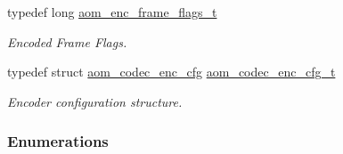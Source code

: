 \begin{DoxyCompactItemize}
typedef long \hyperlink{group__encoder_gacbef92200b831adb94283f84128f83de}{aom\+\_\+enc\+\_\+frame\+\_\+flags\+\_\+t}
\begin{DoxyCompactList}\small\item\em Encoded Frame Flags. \end{DoxyCompactList}\item 
typedef struct \hyperlink{structaom__codec__enc__cfg}{aom\+\_\+codec\+\_\+enc\+\_\+cfg} \hyperlink{group__encoder_gab9627d5dcf858b7e755a5fc4a879e451}{aom\+\_\+codec\+\_\+enc\+\_\+cfg\+\_\+t}
\begin{DoxyCompactList}\small\item\em Encoder configuration structure. \end{DoxyCompactList}\end{DoxyCompactItemize}
\subsubsection*{Enumerations}
